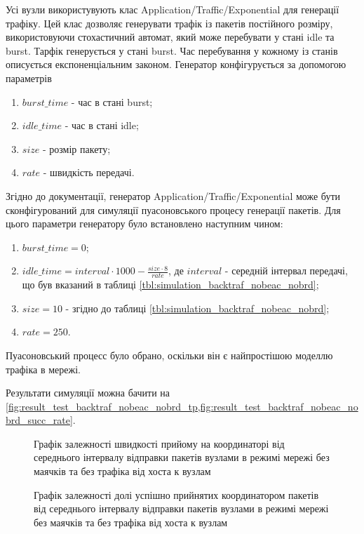 \documentclass[a4paper,ukrainian,utf8,nocolumnsxix,floatsection,equationsection]{eskdtext}
\begin{document}
Усі вузли використувують клас Application/Traffic/Exponential для генерації трафіку. Цей клас дозволяє генерувати трафік із пакетів постійного розміру, використовуючи стохастичний автомат, який може перебувати у стані idle та burst. Тарфік генерується у стані burst. Час перебування у кожному із станів описується експоненціальним законом. Генератор конфігурується за допомогою параметрів 
\begin{enumerate}
	\item $burst\_time$ - час в стані burst;
	\item $idle\_time$ - час в стані idle;
	\item $size$ - розмір пакету;
	\item $rate$ - швидкість передачі.
\end{enumerate}

Згідно до документації, генератор Application/Traffic/Exponential може бути сконфігурований для симуляції пуасоновського процесу генерації пакетів. Для цього параметри генератору було встановлено наступним чином:
\begin{enumerate}
	\item $burst\_time = 0$;
	\item $idle\_time = interval\cdot1000 - \frac{size \cdot 8}{rate}$, де $interval$ - середній інтервал передачі, що був вказаний в таблиці \ref{tbl:simulation_backtraf_nobeac_nobrd};
	\item $size = 10$ - згідно до таблиці \ref{tbl:simulation_backtraf_nobeac_nobrd};
	\item $rate = 250$.
\end{enumerate}

Пуасоновський процесс було обрано, оскільки він є найпростішою моделлю трафіка в мережі.

Результати симуляції можна бачити на \cref{fig:result_test_backtraf_nobeac_nobrd_tp,fig:result_test_backtraf_nobeac_nobrd_succ_rate}.

\begin{figure}[h]
	\centering
	\caption{\label{fig:result_test_backtraf_nobeac_nobrd_tp}Графік залежності швидкості прийому на координаторі від середнього інтервалу відправки пакетів вузлами в режимі мережі без маячків та без трафіка від хоста к вузлам}
\end{figure}

\begin{figure}[h]
	\centering
	\caption{\label{fig:result_test_backtraf_nobeac_nobrd_succ_rate}Графік залежності долі успішно прийнятих координатором пакетів від середнього інтервалу відправки пакетів вузлами в режимі мережі без маячків та без трафіка від хоста к вузлам}
\end{figure}
\end{document}
